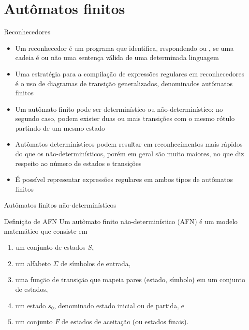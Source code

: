 \section{Autômatos finitos}

\begin{frame}[fragile]{Reconhecedores}

    \begin{itemize}
        \item Um reconhecedor é um programa que identifica, respondendo  ou , se uma cadeia é ou não uma sentença válida de uma
            determinada linguagem

        \item Uma estratégia para a compilação de expressões regulares em reconhecedores é o uso de diagramas de transição generalizados, denominados autômatos
            finitos

        \item Um autômato finito pode ser determinístico ou não-determinístico: no segundo caso, podem exister duas ou mais transições com o mesmo rótulo partindo
            de um mesmo estado

        \item Autômatos determinísticos podem resultar em reconhecimentos mais rápidos do que os não-determinísticos, porém em geral são muito maiores, no
            que diz respeito ao número de estados e transições

        \item É possível representar expressões regulares em ambos tipos de autômatos finitos
    \end{itemize}

\end{frame}

\begin{frame}[fragile]{Autômatos finitos não-determinísticos}

    \begin{block}{Definição de AFN}
        Um autômato finito não-determinístico (AFN) é um modelo matemático que consiste em
        \begin{enumerate}
            \item um conjunto de estados $S$,

            \item um alfabeto $\Sigma$ de símbolos de entrada,

            \item uma função de transição que mapeia pares (estado, símbolo) em um conjunto de estados,

            \item um estado $s_0$, denominado estado inicial ou de partida, e

            \item um conjunto $F$ de estados de aceitação (ou estados finais).
        \end{enumerate}
    \end{block}

\end{frame}

